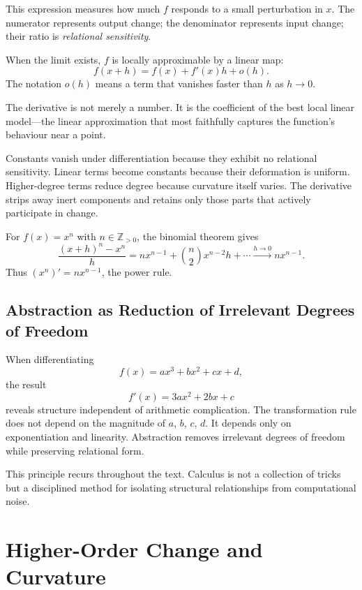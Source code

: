 \documentclass[12pt,openany]{book}
\begin{document}
This expression measures how much $f$ responds to a small perturbation in $x$.
The numerator represents output change; the denominator represents input change;
their ratio is \emph{relational sensitivity}.

When the limit exists, $f$ is locally approximable by a linear map:
\[
  f(x + h) = f(x) + f'(x)h + o(h).
\]
The notation $o(h)$ means a term that vanishes faster than $h$ as $h\to 0$.

\begin{insight}
  The derivative is not merely a number. It is the coefficient of the best
  local linear model—the linear approximation that most faithfully captures
  the function's behaviour near a point.
\end{insight}

Constants vanish under differentiation because they exhibit no relational
sensitivity. Linear terms become constants because their deformation is uniform.
Higher-degree terms reduce degree because curvature itself varies. The
derivative strips away inert components and retains only those parts that
actively participate in change.

\begin{example}
  For $f(x) = x^n$ with $n \in \mathbb{Z}_{>0}$, the binomial theorem gives
  \[
    \frac{(x+h)^n - x^n}{h}
    = nx^{n-1} + \binom{n}{2}x^{n-2}h + \cdots \xrightarrow{h\to 0} nx^{n-1}.
  \]
  Thus $(x^n)' = nx^{n-1}$, the power rule.
\end{example}

\section{Abstraction as Reduction of Irrelevant Degrees of Freedom}

When differentiating
\[
  f(x) = ax^3 + bx^2 + cx + d,
\]
the result
\[
  f'(x) = 3ax^2 + 2bx + c
\]
reveals structure independent of arithmetic complication. The transformation
rule does not depend on the magnitude of $a$, $b$, $c$, $d$. It depends only
on exponentiation and linearity. Abstraction removes irrelevant degrees of
freedom while preserving relational form.

This principle recurs throughout the text. Calculus is not a collection of
tricks but a disciplined method for isolating structural relationships from
computational noise.

\chapter{Higher-Order Change and Curvature}
\label{ch:curvature}
\end{document}

